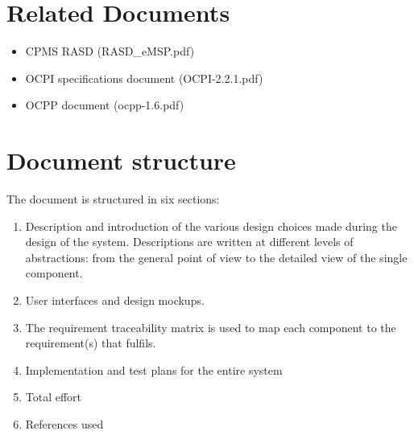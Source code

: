 \section{Related Documents}
\begin{itemize}
	\item {CPMS RASD (RASD\_eMSP.pdf)}
	\item OCPI specifications document (OCPI-2.2.1.pdf)
	\item OCPP document (ocpp-1.6.pdf)
\end{itemize}

\section{Document structure}
The document is structured in six sections:

\begin{enumerate}
	\item Description and introduction of the various design choices made during the design of the system. Descriptions are written at different levels of abstractions: from the general point of view to the detailed view of the single component.
	\item User interfaces and design mockups.
	\item The requirement traceability matrix is used to map each component to the requirement(s) that fulfils.
	\item Implementation and test plans for the entire system
	\item Total effort
	\item References used
\end{enumerate}






















